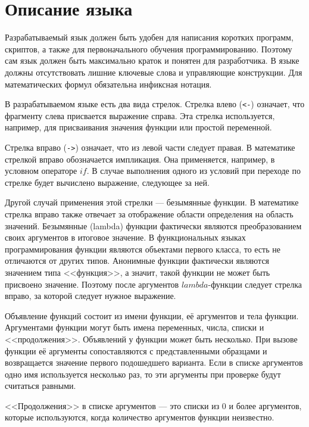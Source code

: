 \section{Описание языка}
    Разрабатываемый язык должен быть удобен для написания коротких программ, скриптов, а также для первоначального обучения программированию.
    Поэтому сам язык должен быть максимально краток и понятен для разработчика.
    В языке должны отсутствовать лишние ключевые слова и управляющие конструкции.
    Для математических формул обязательна инфиксная нотация.

    В разрабатываемом языке есть два вида стрелок.
    Стрелка влево (\verb!<-!) означает, что фрагменту слева присвается выражение справа.
    Эта стрелка используется, например, для присваивания значения функции или простой переменной.

    Стрелка вправо (\verb!->!) означает, что из левой части следует правая.
    В математике стрелкой вправо обозначается импликация.
    Она применяется, например, в условном операторе $if$.
    В случае выполнения одного из условий при переходе по стрелке будет вычислено выражение, следующее за ней.
    
    Другой случай применения этой стрелки --- безымянные функции.
    В математике стрелка вправо также отвечает за отображение области определения на область значений.
    Безымянные (lambda) функции фактически являются преобразованием своих аргументов в итоговое значение.
    В функциональных языках программирования функции являются объектами первого класса, то есть не отличаются от других типов.
    Анонимные функции фактически являются значением типа <<функция>>, а значит, такой функции не может быть присвоено значение.
    Поэтому после аргументов $lambda$-функции следует стрелка вправо, за которой следует нужное выражение.

    Объявление функций состоит из имени функции, её аргументов и тела функции.
    Аргументами функции могут быть имена переменных, числа, списки и <<продолжения>>.
    Объявлений у функции может быть несколько.
    При вызове функции её аргументы сопоставляются с представленными образцами и возвращается значение первого подошедшего варианта.
    Если в списке аргументов одно имя используется несколько раз, то эти аргументы при проверке будут считаться равными.

    <<Продолжения>> в списке аргументов --- это списки из 0 и более аргументов, которые используются, когда количество аргументов функции неизвестно.

